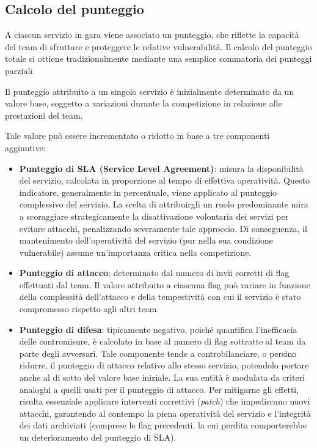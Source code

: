 \subsection{Calcolo del punteggio}

A ciascun servizio in gara viene associato un punteggio, che riflette la capacità del team di sfruttare e proteggere le relative vulnerabilità. Il calcolo del punteggio totale si ottiene tradizionalmente mediante una semplice sommatoria dei punteggi parziali.

Il punteggio attribuito a un singolo servizio è inizialmente determinato da un valore base, soggetto a variazioni durante la competizione in relazione alle prestazioni del team.

Tale valore può essere incrementato o ridotto in base a tre componenti aggiuntive:

\begin{itemize}
    \setlength{\itemsep}{2pt}
    \setlength{\parskip}{2pt}
    \item \textbf{Punteggio di SLA (Service Level Agreement)}: misura la disponibilità del servizio, calcolata in proporzione al tempo di effettiva operatività.
    Questo indicatore, generalmente in percentuale, viene applicato al punteggio complessivo del servizio. La scelta di attribuirgli un ruolo predominante mira a scoraggiare strategicamente la disattivazione volontaria dei servizi per evitare attacchi, penalizzando severamente tale approccio. Di conseguenza, il mantenimento dell’operatività del servizio (pur nella sua condizione vulnerabile) assume un’importanza critica nella competizione.
    \item \textbf{Punteggio di attacco}: determinato dal numero di invii corretti di flag effettuati dal team. Il valore attribuito a ciascuna flag può variare in funzione della complessità dell’attacco e della tempestività con cui il servizio è stato compromesso rispetto agli altri team.
    \item \textbf{Punteggio di difesa}: tipicamente negativo, poiché quantifica l’inefficacia delle contromisure, è calcolato in base al numero di flag sottratte al team da parte degli avversari. Tale componente tende a controbilanciare, o persino ridurre, il punteggio di attacco relativo allo stesso servizio, potendolo portare anche al di sotto del valore base iniziale. La sua entità è modulata da criteri analoghi a quelli usati per il punteggio di attacco. Per mitigarne gli effetti, risulta essenziale applicare interventi correttivi (\emph{patch}) che impediscano nuovi attacchi, garantendo al contempo la piena operatività del servizio e l’integrità dei dati archiviati (comprese le flag precedenti, la cui perdita comporterebbe un deterioramento del punteggio di SLA).
\end{itemize}

